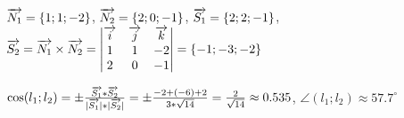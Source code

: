 \documentclass{article}
\def\vec{\ensuremath\overrightarrow}
\begin{document}
\begin{flushleft}
$\vec{N_1} = \{ 1; 1; -2 \}$, $\vec{N_2} = \{ 2; 0; -1 \}$, $\vec{S_1} = \{ 2; 2; -1 \}$, $\vec{S_2} = \vec{N_1} \times \vec{N_2} = \begin{vmatrix}
    \vec{i} & \vec{j} & \vec{k} \\
    1 & 1 & -2 \\
    2 & 0 & -1
\end{vmatrix} = \{ -1; -3; -2 \} $

$\cos(l_1; l_2) = \pm \frac{\vec{S_1} * \vec{S_2}}{|\vec{S_1}| * |\vec{S_2}|} = \pm \frac{-2 + (-6) + 2}{3 * \sqrt{14}} = \frac{2}{\sqrt{14}} \approx 0.535$, $\angle (l_1; l_2) \approx 57.7^\circ$

\end{flushleft}
\end{document}
